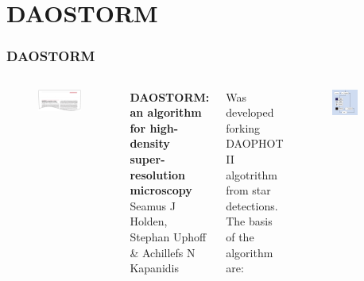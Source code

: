 \documentclass[aspectratio=169]{beamer}
\begin{document}
\section{DAOSTORM}


\begin{frame}
\frametitle{DAOSTORM}

\begin{columns}[c]


 

\begin{figure}[h!]
    \centering	\includegraphics[width=\textwidth]{./images/dao_paper.pdf} 
    \end{figure} 
    
\textbf{DAOSTORM: an algorithm for high-density super-resolution microscopy}  \\  
Seamus J Holden, Stephan Uphoff \& Achillefs N Kapanidis



Was developed forking DAOPHOT II algotrithm from star detections. The basis of the algorithm are: 

\begin{figure}[h!]
    \centering	\includegraphics[width=0.6\textwidth]{./images/dao_workflow.pdf} 
    \end{figure} 





\end{columns}
    
    
\end{frame}
\end{document}
